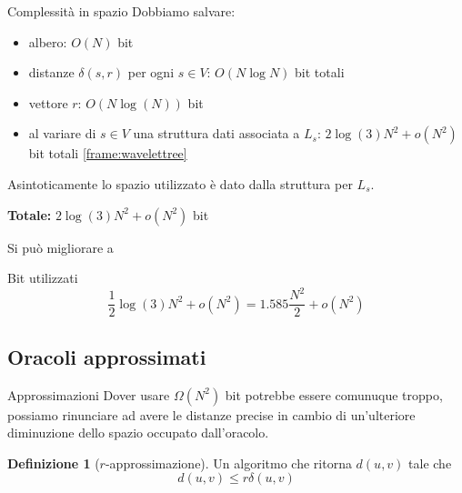 \documentclass{beamer}
\newcounter{counter1}
\theoremstyle{plain}
\theoremstyle{definition}
\newtheorem{mydef}[counter1]{Definizione}
\theoremstyle{remark}
\newcommand{\pa}[1]{\left(#1\right)}
\begin{document}
\begin{frame}{Complessità in spazio}
  Dobbiamo salvare:
  \begin{itemize}
  \item albero: $O\pa{N}$ bit
  \item distanze $\delta\pa{s,r}$ per ogni $s\in V$: $O\pa{ N \log N}$
    bit totali
  \item vettore $r$: $O\pa{N \log\pa{N}}$ bit 
  \item al variare di $s\in V$ una struttura dati associata a $L_s$:
    $2\log\pa{3} N^2 + o(N^2)$ bit totali {\color{white}
      \ref{frame:wavelettree}}
  \end{itemize}
  Asintoticamente lo spazio utilizzato è dato dalla struttura per
  $L_s$.

  \textbf{Totale:} ${2}\log\pa{3} N^2 + o(N^2)$ bit \vfill
  \pause

  Si pu\`o migliorare a 
  \begin{block}{Bit utilizzati}
    \[ \frac{1}{2}\log\pa{3} N^2 + o\pa{N^2} = 1.585 \frac{N^2}{2} +
    o\pa{N^2} \]
  \end{block}
\end{frame}

\subsection{Oracoli approssimati}

\begin{frame}{Approssimazioni}
  Dover usare $\Omega \pa{N^2}$ bit potrebbe essere comunuque troppo,
  possiamo rinunciare ad avere le distanze precise in cambio di
  un'ulteriore diminuzione dello spazio occupato dall'oracolo.
  \vfill
  
  \begin{mydef}[$r$-approssimazione]
    Un algoritmo che ritorna $d(u,v)$ tale che
    \[ d\pa{u,v} \le r \delta\pa{u,v} \]
  \end{mydef}
\end{frame}
\end{document}
